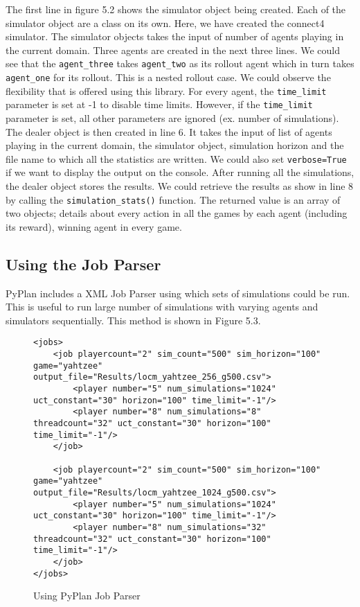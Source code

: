 \documentclass[double,12pt]{beavtex}
\begin{document}
The first line in figure 5.2 shows the simulator object being created. Each of the simulator object are a class on its own. Here, we have created the connect4 simulator. The simulator objects takes the input of number of agents playing in the current domain. Three agents are created in the next three lines. We could see that the \verb|agent_three| takes \verb|agent_two| as its rollout agent which in turn takes \verb|agent_one| for its rollout. This is a nested rollout case. We could observe the flexibility that is offered using this library. For every agent, the \verb|time_limit| parameter is set at -1 to disable time limits. However, if the \verb|time_limit| parameter is set, all other parameters are ignored (ex. number of simulations). The dealer object is then created in line 6. It takes the input of list of agents playing in the current domain, the simulator object, simulation horizon and the file name to which all the statistics are written. We could also set \verb|verbose=True| if we want to display the output on the console. After running all the simulations, the dealer object stores the results. We could retrieve the results as show in line 8 by calling the \verb|simulation_stats()| function. The returned value is an array of two objects; details about every action in all the games by each agent (including its reward), winning agent in every game.

\subsection{Using the Job Parser}
PyPlan includes a XML Job Parser using which sets of simulations could be run. This is useful to run large number of simulations with varying agents and simulators sequentially. This method is shown in Figure 5.3.

\begin{figure}[!ht]
\begin{lstlisting}
<jobs>
    <job playercount="2" sim_count="500" sim_horizon="100" game="yahtzee" output_file="Results/locm_yahtzee_256_g500.csv">
        <player number="5" num_simulations="1024" uct_constant="30" horizon="100" time_limit="-1"/>
        <player number="8" num_simulations="8" threadcount="32" uct_constant="30" horizon="100" time_limit="-1"/>
    </job>

    <job playercount="2" sim_count="500" sim_horizon="100" game="yahtzee" output_file="Results/locm_yahtzee_1024_g500.csv">
        <player number="5" num_simulations="1024" uct_constant="30" horizon="100" time_limit="-1"/>
        <player number="8" num_simulations="32" threadcount="32" uct_constant="30" horizon="100" time_limit="-1"/>
    </job>
</jobs>
\end{lstlisting}
\caption{Using PyPlan Job Parser}
\end{figure}
\end{document}
